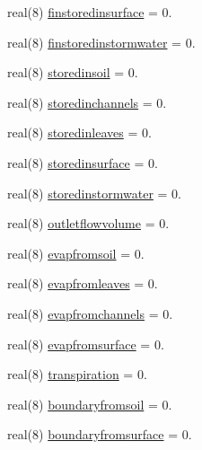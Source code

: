 \begin{DoxyCompactItemize}
\item 
real(8) \mbox{\hyperlink{structmodulebasin_1_1t__basinwaterbalance_a82fa20120703e3ac3ea41f6e2c9dae6c}{finstoredinsurface}} = 0.
\item 
real(8) \mbox{\hyperlink{structmodulebasin_1_1t__basinwaterbalance_a051b8f06e9fc9824e747537f7521bd6f}{finstoredinstormwater}} = 0.
\item 
real(8) \mbox{\hyperlink{structmodulebasin_1_1t__basinwaterbalance_a013fd139b2331ee5221b1ea77648ca99}{storedinsoil}} = 0.
\item 
real(8) \mbox{\hyperlink{structmodulebasin_1_1t__basinwaterbalance_ae60cc2ddbe0c1613cdd3b70058d6ba0e}{storedinchannels}} = 0.
\item 
real(8) \mbox{\hyperlink{structmodulebasin_1_1t__basinwaterbalance_ac49d68c8f651355f28e4d878458a5851}{storedinleaves}} = 0.
\item 
real(8) \mbox{\hyperlink{structmodulebasin_1_1t__basinwaterbalance_acd1d13a50ad8652e02118a23da2e9834}{storedinsurface}} = 0.
\item 
real(8) \mbox{\hyperlink{structmodulebasin_1_1t__basinwaterbalance_a21dae5686907035cfcfdd5e585c8fba5}{storedinstormwater}} = 0.
\item 
real(8) \mbox{\hyperlink{structmodulebasin_1_1t__basinwaterbalance_a7f141a67bf677e9c74ec8f61df580087}{outletflowvolume}} = 0.
\item 
real(8) \mbox{\hyperlink{structmodulebasin_1_1t__basinwaterbalance_adcdb7c9e1c9aec67a6c631bf4f5ad11a}{evapfromsoil}} = 0.
\item 
real(8) \mbox{\hyperlink{structmodulebasin_1_1t__basinwaterbalance_aafb4f161fa2068b6d749ef67912797b1}{evapfromleaves}} = 0.
\item 
real(8) \mbox{\hyperlink{structmodulebasin_1_1t__basinwaterbalance_a640ca696e88a47f9ce9231542fabb204}{evapfromchannels}} = 0.
\item 
real(8) \mbox{\hyperlink{structmodulebasin_1_1t__basinwaterbalance_a26de6eb22fbe442b79f5447c24e79dbf}{evapfromsurface}} = 0.
\item 
real(8) \mbox{\hyperlink{structmodulebasin_1_1t__basinwaterbalance_a0902a07ff488ab981df08da0548e7368}{transpiration}} = 0.
\item 
real(8) \mbox{\hyperlink{structmodulebasin_1_1t__basinwaterbalance_ad2c49ddac1f5d0988c0e9617c8f3bc38}{boundaryfromsoil}} = 0.
\item 
real(8) \mbox{\hyperlink{structmodulebasin_1_1t__basinwaterbalance_ad094edcff83ba5ae6eadeed6ba14bf69}{boundaryfromsurface}} = 0.

\end{DoxyCompactItemize}
